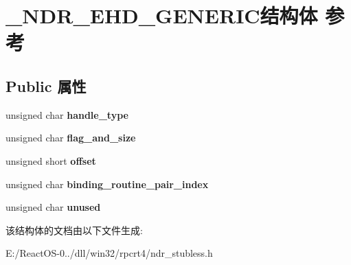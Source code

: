 \hypertarget{struct___n_d_r___e_h_d___g_e_n_e_r_i_c}{}\section{\+\_\+\+N\+D\+R\+\_\+\+E\+H\+D\+\_\+\+G\+E\+N\+E\+R\+I\+C结构体 参考}
\label{struct___n_d_r___e_h_d___g_e_n_e_r_i_c}
\subsection*{Public 属性}
\begin{DoxyCompactItemize}
\item 
\mbox{\label{struct___n_d_r___e_h_d___g_e_n_e_r_i_c_acc8a0f36f14240816965392b22983768}} 
unsigned char {\bfseries handle\+\_\+type}
\item 
\mbox{\label{struct___n_d_r___e_h_d___g_e_n_e_r_i_c_a72d7212217c943b47d2a8cbdc39bfc18}} 
unsigned char {\bfseries flag\+\_\+and\+\_\+size}
\item 
\mbox{\label{struct___n_d_r___e_h_d___g_e_n_e_r_i_c_ab4b63284234efd0a2cc65d6c69291995}} 
unsigned short {\bfseries offset}
\item 
\mbox{\label{struct___n_d_r___e_h_d___g_e_n_e_r_i_c_ae62890f3d4020696a4ea4a5cf7ad25c2}} 
unsigned char {\bfseries binding\+\_\+routine\+\_\+pair\+\_\+index}
\item 
\mbox{\label{struct___n_d_r___e_h_d___g_e_n_e_r_i_c_a990fed6947e90a2d812ed7566f051dbf}} 
unsigned char {\bfseries unused}
\end{DoxyCompactItemize}


该结构体的文档由以下文件生成\+:\begin{DoxyCompactItemize}
\item 
E\+:/\+React\+O\+S-\/0../dll/win32/rpcrt4/ndr\+\_\+stubless.\+h\end{DoxyCompactItemize}
